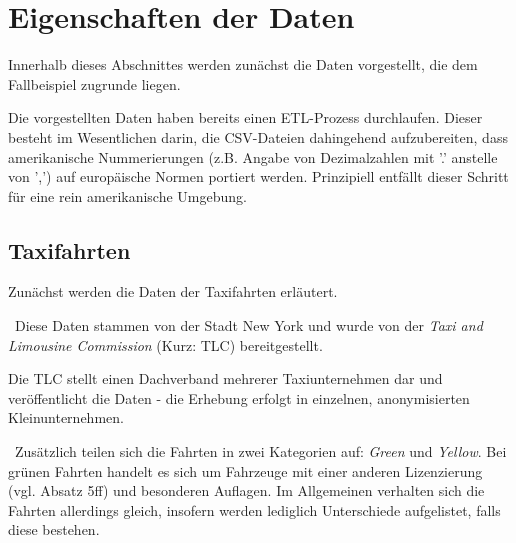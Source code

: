 \section{Eigenschaften der Daten}
\label{sec:Daten}
Innerhalb dieses Abschnittes werden zunächst die Daten vorgestellt, die dem Fallbeispiel zugrunde liegen. 

Die vorgestellten Daten haben bereits einen ETL-Prozess durchlaufen. Dieser besteht im Wesentlichen darin, die CSV-Dateien dahingehend aufzubereiten, dass amerikanische Nummerierungen (z.B. Angabe von Dezimalzahlen mit '.' anstelle von ',') auf europäische Normen portiert werden. Prinzipiell entfällt dieser Schritt für eine rein amerikanische Umgebung. 
\subsection{Taxifahrten}
\label{subsec:Taxidaten}
Zunächst werden die Daten der Taxifahrten erläutert. 

~\newline Diese Daten stammen von der Stadt New York \cite{SourceTaxi} und wurde von der \textit{Taxi and Limousine Commission} (Kurz: TLC) bereitgestellt. 

Die TLC stellt einen Dachverband mehrerer Taxiunternehmen dar und veröffentlicht die Daten - die Erhebung erfolgt in einzelnen, anonymisierten Kleinunternehmen. 

~\newline Zusätzlich teilen sich die Fahrten in zwei Kategorien auf: \textit{Green} und \textit{Yellow}. Bei grünen Fahrten handelt es sich um Fahrzeuge mit einer anderen Lizenzierung (vgl. \cite{GreenTaxis} Absatz 5ff) und besonderen Auflagen. Im Allgemeinen verhalten sich die Fahrten allerdings gleich, insofern werden lediglich Unterschiede aufgelistet, falls diese bestehen.
